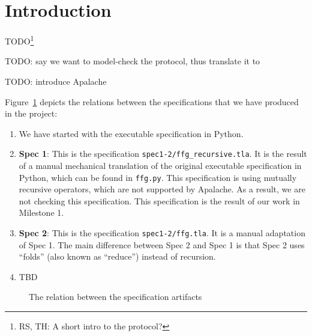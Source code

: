 
\section{Introduction}

TODO\footnote{RS, TH: A short intro to the protocol?}

TODO: say we want to model-check the protocol, thus translate it to \tlap{}

TODO: introduce Apalache

Figure~\ref{fig:artifacts} depicts the relations between the specifications
that we have produced in the project:

\begin{enumerate}
    \item We have started with the executable specification in Python.

    \item \textbf{Spec 1}: This is the specification
        \texttt{spec1-2/ffg\_recursive.tla}. It is the result of a manual
        mechanical translation of the original executable specification in
        Python, which can be found in \texttt{ffg.py}. This specification is
        using mutually recursive operators, which are not supported by
        Apalache. As a result, we are not checking this specification. This
        specification is the result of our work in Milestone 1.

    \item \textbf{Spec 2}: This is the specification \texttt{spec1-2/ffg.tla}. It
        is a manual adaptation of Spec 1. The main difference between Spec 2
        and Spec 1 is that Spec 2 uses ``folds'' (also known as ``reduce'')
        instead of recursion.

    \item TBD

\end{enumerate}

\begin{figure}
  
  \caption{The relation between the specification artifacts}\label{fig:artifacts}
\end{figure}
